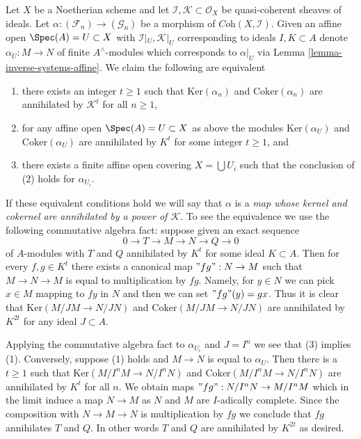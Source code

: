 \begin{remark}
\label{remark-inverse-systems-kernel-cokernel-annihilated-by}
Let $X$ be a Noetherian scheme and let
$\mathcal{I}, \mathcal{K} \subset \mathcal{O}_X$
be quasi-coherent sheaves of ideals. Let
$\alpha : (\mathcal{F}_n) \to (\mathcal{G}_n)$ be a morphism of
$\textit{Coh}(X, \mathcal{I})$.
Given an affine open $\Spec(A) = U \subset X$ with
$\mathcal{I}|_U, \mathcal{K}|_U$ corresponding to ideals $I, K \subset A$
denote $\alpha_U : M \to N$ of finite $A^\wedge$-modules which
corresponds to $\alpha|_U$ via Lemma \ref{lemma-inverse-systems-affine}.
We claim the following are equivalent
\begin{enumerate}
\item there exists an integer $t \geq 1$ such that
$\text{Ker}(\alpha_n)$ and $\text{Coker}(\alpha_n)$
are annihilated by $\mathcal{K}^t$ for all $n \geq 1$,
\item for any affine open $\Spec(A) = U \subset X$ as above
the modules $\text{Ker}(\alpha_U)$ and $\text{Coker}(\alpha_U)$
are annihilated by $K^t$ for some integer $t \geq 1$, and
\item there exists a finite affine open covering $X = \bigcup U_i$
such that the conclusion of (2) holds for $\alpha_{U_i}$.
\end{enumerate}
If these equivalent conditions hold we will say that
$\alpha$ is a
{\it map whose kernel and cokernel are annihilated by a power of
$\mathcal{K}$}.
To see the equivalence we use the following commutative algebra fact:
suppose given an exact sequence
$$
0 \to T \to M \to N \to Q \to 0
$$
of $A$-modules with $T$ and $Q$ annihilated by $K^t$ for some
ideal $K \subset A$. Then for every $f, g \in K^t$ there exists a
canonical map $"fg": N \to M$ such that $M \to N \to M$ is equal to
multiplication by $fg$. Namely, for $y \in N$ we can pick $x \in M$
mapping to $fy$ in $N$ and then we can set $"fg"(y) = gx$. Thus it is
clear that $\text{Ker}(M/JM \to N/JN)$ and $\text{Coker}(M/JM \to N/JN)$
are annihilated by $K^{2t}$ for any ideal $J \subset A$.

\medskip\noindent
Applying the commutative algebra fact to $\alpha_{U_i}$ and $J = I^n$
we see that (3) implies (1). Conversely,
suppose (1) holds and $M \to N$ is equal to $\alpha_U$. Then there is
a $t \geq 1$ such that
$\text{Ker}(M/I^nM \to N/I^nN)$ and $\text{Coker}(M/I^nM \to N/I^nN)$
are annihilated by $K^t$ for all $n$. We obtain maps
$"fg" : N/I^nN \to M/I^nM$ which in the limit induce a map $N \to M$
as $N$ and $M$ are $I$-adically complete. Since the composition with
$N \to M \to N$ is multiplication by $fg$ we conclude that $fg$
annihilates $T$ and $Q$. In other words $T$ and $Q$ are annihilated by
$K^{2t}$ as desired.
\end{remark}

